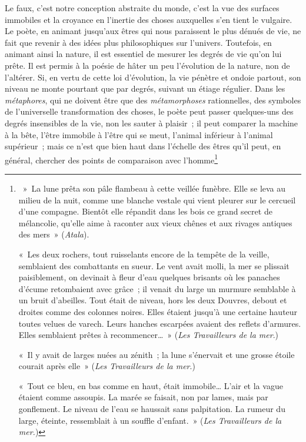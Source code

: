 \documentclass[french,twoside]{book} %
\begin{document}
Le faux, c’est notre conception abstraite du monde, c’est la vue des surfaces immobiles et la croyance en l’inertie des choses auxquelles s’en tient le vulgaire. Le poète, en animant jusqu’aux êtres qui nous paraissent le plus dénués de vie, ne fait que revenir à des idées plus philosophiques sur l’univers. Toutefois, en animant ainsi la nature, il est essentiel de mesurer les degrés de vie qu’on lui prête. Il est permis à la poésie de hâter un peu l’évolution de la nature, non de l’altérer. Si, en vertu de cette loi d’évolution, la vie pénètre et ondoie partout, son niveau ne monte pourtant que par degrés, suivant un étiage régulier. Dans les \emph{métaphores}, qui ne doivent être que des \emph{métamorphoses} rationnelles, des symboles de l’universelle transformation des choses, le poète peut passer quelques-uns des degrés insensibles de la vie, non les sauter à plaisir ; il peut comparer la machine à la bête, l’être immobile à l’être qui se meut, l’animal inférieur à l’animal supérieur ; mais ce n’est que bien haut dans l’échelle des êtres qu’il peut, en général, chercher des points de comparaison avec l’homme\footnote{\noindent  » La lune prêta son pâle flambeau à cette veillée funèbre. Elle se leva au milieu de la nuit, comme une blanche vestale qui vient pleurer sur le cercueil d’une compagne. Bientôt elle répandit dans les bois ce grand secret de mélancolie, qu’elle aime à raconter aux vieux chênes et aux rivages antiques des mers » (\emph{Atala}).\par
« Les deux rochers, tout ruisselants encore de la tempête de la veille, semblaient des combattants en sueur. Le vent avait molli, la mer se plissait paisiblement, on devinait à fleur d’eau quelques brisants où les panaches d’écume retombaient avec grâce ; il venait du large un murmure semblable à un bruit d’abeilles. Tout était de niveau, hors les deux Douvres, debout et droites comme des colonnes noires. Elles étaient jusqu’à une certaine hauteur toutes velues de varech. Leurs hanches escarpées avaient des reflets d’armures. Elles semblaient prêtes à recommencer… » (\emph{Les Travailleurs de la mer}.)\par
« Il y avait de larges nuées au zénith ; la lune s’énervait et une grosse étoile courait après elle » (\emph{Les Travailleurs de la mer}.)\par
« Tout ce bleu, en bas comme en haut, était immobile… L’air et la vague étaient comme assoupis. La marée se faisait, non par lames, mais par gonflement. Le niveau de l’eau se haussait sans palpitation. La rumeur du large, éteinte, ressemblait à un souffle d’enfant. » (\emph{Les Travailleurs de la mer.})\par
}
\end{document}
